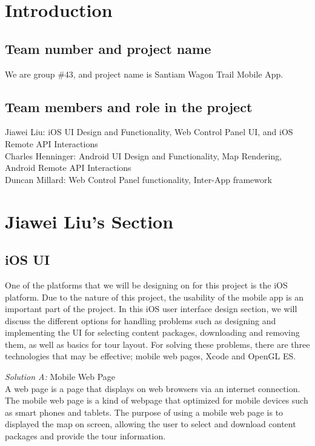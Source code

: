 \documentclass[letterpaper, 10pt,titlepage]{article}
\begin{document}
\tableofcontents
\newpage



\section{Introduction}
\subsection{Team number and project name}
We are group \#43, and project name is Santiam Wagon Trail Mobile App.


\subsection{Team members and role in the project}
Jiawei Liu: iOS UI Design and Functionality, Web Control Panel UI, and iOS Remote API Interactions \\
Charles Henninger: Android UI Design and Functionality, Map Rendering, Android Remote API Interactions\\
Duncan Millard: Web Control Panel functionality, Inter-App framework

\vspace{0.3cm}




\section{Jiawei Liu's Section}

\subsection{iOS UI}
One of the platforms that we will be designing on for this project is the iOS platform. Due to the nature of this project, the usability of the mobile app is an important part of the project. In this iOS user interface design section, we will discuss the different options for handling problems such as designing and implementing the UI for selecting content packages, downloading and removing them, as well as basics for tour layout. For solving these problems, there are three technologies that may be effective; mobile web pages, Xcode and OpenGL ES.


\textit{Solution A:} Mobile Web Page\\
A web page is a page that displays on web browsers via an internet connection. The mobile web page is a kind of webpage that optimized for mobile devices such as smart phones and tablets. The purpose of using a mobile web page is to displayed the map on screen, allowing the user to select and download content packages and provide the tour information.
\end{document}
